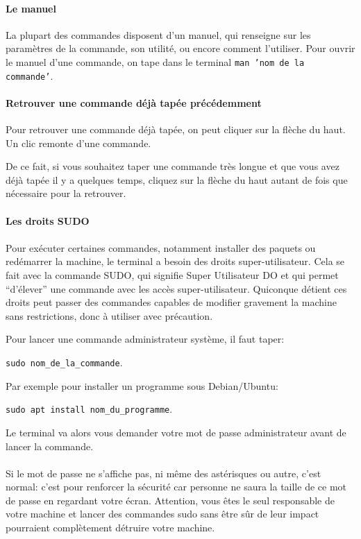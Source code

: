 \paragraph{Le manuel} La plupart des commandes disposent d'un manuel, qui
renseigne sur les paramètres de la commande, son utilité, ou encore comment
l'utiliser. Pour ouvrir le manuel d'une commande, on tape dans le terminal
\texttt{man 'nom de la commande'}.

\paragraph{Retrouver une commande déjà tapée précédemment} Pour retrouver une
commande déjà tapée, on peut cliquer sur la flèche du haut. Un clic remonte
d'une commande.

De ce fait, si vous souhaitez taper une commande très longue et que vous avez
déjà tapée il y a quelques temps, cliquez sur la flèche du haut autant de fois
que nécessaire pour la retrouver.

\paragraph{Les droits SUDO}

\paragraph{} Pour exécuter certaines commandes, notamment installer des paquets
ou redémarrer la machine, le terminal a besoin des droits super-utilisateur.
Cela se fait avec la commande SUDO, qui signifie Super Utilisateur DO et qui
permet ``d'élever'' une commande avec les accès super-utilisateur. Quiconque
détient ces droits peut passer des commandes capables de modifier gravement la
machine sans restrictions, donc à utiliser avec précaution.

Pour lancer une commande administrateur système, il faut taper:

\texttt{sudo nom_de_la_commande}.

Par exemple pour installer un programme sous Debian/Ubuntu:

\texttt{sudo apt install nom_du_programme}.

Le terminal va alors vous demander votre mot de passe administrateur avant de
lancer la commande.

\paragraph{} Si le mot de passe ne s'affiche pas, ni même des astérisques ou
autre, c'est normal: c'est pour renforcer la sécurité car personne ne saura
la taille de ce mot de passe en regardant votre écran. Attention, vous êtes le
seul responsable de votre machine et lancer des commandes sudo sans être sûr de
leur impact pourraient complètement détruire votre machine.

